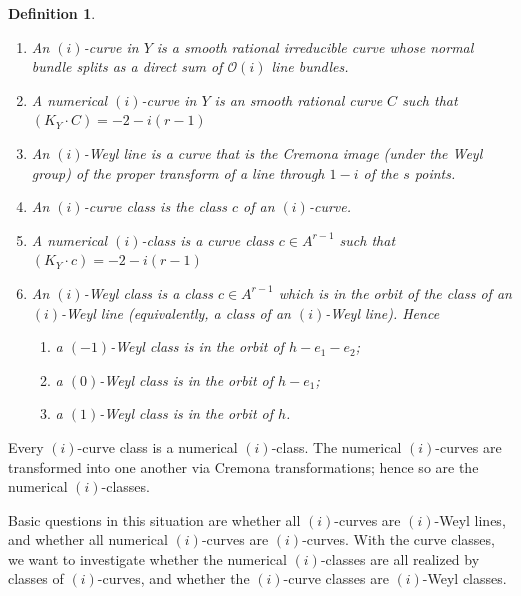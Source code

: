 \documentclass[12pt]{article}
\newtheorem{definition}[equation]{Definition}
\newtheorem{remark}[equation]{Remark}
\numberwithin{equation}{section}
\numberwithin{subeq}{equation}
\def\calO{\mathcal{O}}
\begin{document}
\begin{definition}\label{def3.5}
\begin{enumerate} Fix $i \in \{-1,0,1\}$, and let $Y=Y^r_s$.
\item An \emph{$(i)$-curve} in $Y$ is a smooth rational  irreducible curve
whose normal bundle splits as a direct sum of $\calO(i)$ line bundles.
\item A \emph{numerical $(i)$-curve} in $Y$ is an smooth rational curve $C$ such that
$(K_Y \cdot C) = -2 -i(r-1)$
\item An \emph{$(i)$-Weyl line} is a curve that is the Cremona image 
(under the Weyl group) of the proper transform of a line through $1-i$ of the $s$ points.
\item An \emph{$(i)$-curve class} is the class $c$ of an $(i)$-curve.
\item A \emph{numerical $(i)$-class} is a curve class $c \in A^{r-1}$ such that
$(K_Y \cdot c ) = -2 -i(r-1)$
\item An \emph{$(i)$-Weyl class} is a class $c \in A^{r-1}$
which is in the orbit of the class of an $(i)$-Weyl line
(equivalently, a class of an $(i)$-Weyl line). Hence
\begin{enumerate}
\item a $(-1)$-Weyl class is in the orbit of $h-e_{1}-e_{2}$; 
\item a $(0)$-Weyl class is in the orbit of $h-e_1$;
\item a $(1)$-Weyl class is in the orbit of $h$.
\end{enumerate}
\end{enumerate}
\end{definition}


Every $(i)$-curve class is a numerical $(i)$-class.
The numerical $(i)$-curves
are transformed into one another via Cremona transformations;
hence so are the numerical $(i)$-classes.

Basic questions in this situation are whether all $(i)$-curves are $(i)$-Weyl lines,
and whether all numerical $(i)$-curves are $(i)$-curves.
With the curve classes, we want to investigate
whether the numerical $(i)$-classes are all realized by classes of $(i)$-curves,
and whether the $(i)$-curve classes are $(i)$-Weyl classes.
\end{document}
